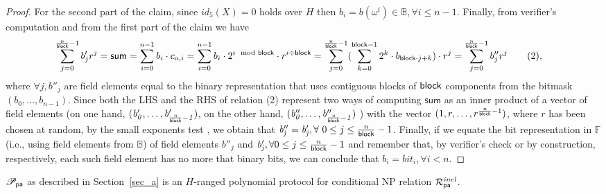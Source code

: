 \begin{proof}
\noindent For the second part of the claim, since $id_5(X) = 0$ holds over $H$ then 
$b_i = b(\omega^i) \in \mathbb{B}, \forall i \leq n-1$. Finally, from 
verifier's computation and from the first part of the claim we have 
\begin{align*}
\sum_{j=0}^{\frac{n}{\mathsf{block}}-1} b'_{j}r^j = \mathsf{sum} =  \sum_{i=0}^{n-1} b_i \cdot c_{a,i} & = \sum_{i=0}^{n-1} b_i \cdot 2^{i \mod {\mathsf{block}}} \cdot r^{i \div \mathsf{block}} =  \sum_{j=0}^{\frac{n}{\mathsf{block}} -1} (\sum_{k=0}^{\mathsf{block} -1} 2^k \cdot b_{\mathsf{block}\cdot j +k}) \cdot r^j = \sum_{j=0}^{\frac{n}{\mathsf{block}} -1} b''_{j}r^j \tag{2},
\end{align*}
where $\forall j, b''_{j}$ are field elements equal to the binary representation that uses contiguous blocks 
of $\mathsf{block}$ components from the bitmask $(\mathit{b}_0, \ldots, \mathit{b}_{n-1})$.
Since both the LHS and the RHS of relation (2) represent two ways of computing $\mathsf{sum}$ as an inner product of a vector 
of field elements (on one hand, $(\mathit{b'_{0}}, \ldots, \mathit{b'_{\frac{n}{\mathsf{block}}-1}})$, on the other hand, 
$(\mathit{b''_{0}}, \ldots, \mathit{b''_{\frac{n}{\mathsf{block}}-1}})$ ) with the vector $(1, r, \ldots, r^{\frac{n}{\mathsf{block}}-1})$, 
where $r$ has been chosen at random, by the small exponents test \cite{small_exponents}, we obtain that \ewnp 
$\mathit{b''_{j}} = \mathit{b'_{j}}, \\ \forall \ 0 \leq j\leq \frac{n}{\mathsf{block}}-1$. Finally, if we equate the bit representation in $\mathbb{F}$ 
(i.e., using field elements from $\mathbb{B}$) of field elements $\mathit{b''_{j}}$ and $\mathit{b'_{j}}, \forall 0\leq j\leq \frac{n}{\mathsf{block}}-1$ and remember that, 
by verifier's check or by construction, respectively, each such field element has no more that \block binary bits, we can conclude that \ewnp 
$b_i = \mathit{bit_i}, \forall i <n$.
\end{proof}

\begin{lemma} 
$\mathscr{P}_{\mathsf{pa}}$ as described in Section~\ref{sec_a} is an $H$-ranged polynomial protocol for conditional NP relation $\mathcal{R}^{\mathit{incl}}_{\mathsf{pa}}$.
\end{lemma}

